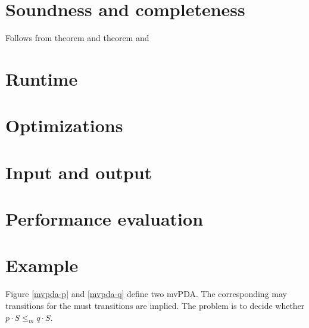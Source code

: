 \section{Soundness and completeness}

Follows from theorem \label{theorem:refinement-tree} and
theorem \label{theorem:tree-attack} and


\section{Runtime}


\section{Optimizations}





\section{Input and output}


\section{Performance evaluation}

\section{Example}

Figure \ref{mvpda-p} and \ref{mvpda-q} define two mvPDA. The corresponding may transitions for the must transitions are implied.
The problem is to decide whether $p⋅S ≤_m q⋅S$.

